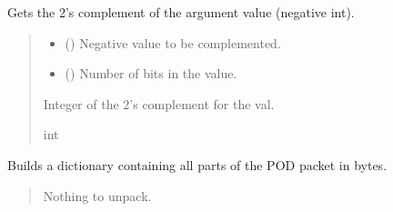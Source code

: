 \documentclass[letterpaper,10pt,english]{sphinxmanual}
\begin{document}
\begin{fulllineitems}

\begin{fulllineitems}
\label{\detokenize{PodApi.Packets:PodApi.Packets.Packet.Packet.TwosComplement}}
\pysigstartsignatures
{}
\pysigstopsignatures
\sphinxAtStartPar
Gets the 2’s complement of the argument value (negative int).
\begin{quote}\begin{description}
\begin{itemize}
\item {} 
\sphinxAtStartPar
{} () \textendash{} Negative value to be complemented.

\item {} 
\sphinxAtStartPar
{} () \textendash{} Number of bits in the value.

\end{itemize}

\sphinxAtStartPar
Integer of the 2’s complement for the val.

\sphinxAtStartPar
int

\end{description}\end{quote}

\end{fulllineitems}


\begin{fulllineitems}
\label{\detokenize{PodApi.Packets:PodApi.Packets.Packet.Packet.UnpackAll}}
\pysigstartsignatures
{}
\pysigstopsignatures
\sphinxAtStartPar
Builds a dictionary containing all parts of the POD packet in bytes.
\begin{quote}\begin{description}
\sphinxAtStartPar
{} \textendash{} Nothing to unpack.


\end{description}
\end{quote}
\end{fulllineitems}
\end{fulllineitems}
\end{document}
